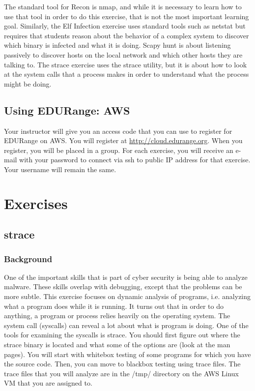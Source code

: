 \documentclass[11pt]{report}
\begin{document}
 The standard tool for Recon is nmap, and while it is necessary to learn how to use 
that tool in order to do this exercise, that is
not the most important learning goal.  Similarly, the Elf Infection 
exercise uses standard tools such as netstat but requires that students
reason about the behavior of a complex system to discover which binary is infected and 
what it is doing.
Scapy hunt is about listening passively to discover hosts on the local network and 
which other hosts they are talking to.
The strace exercise uses the strace utility, but it is about how to look at the system calls that
a process makes in order to understand what the process might be doing.  


\subsection*{Using EDURange: AWS}
Your instructor will give you an access code that you can use to register for 
EDURange on AWS.  You will register at \url{http://cloud.edurange.org}.
When you register, you will be placed in a group.  For each exercise,
you will receive an e-mail with your password to connect via ssh to 
public IP address for that exercise.  Your username will remain the same.



\section{Exercises}

\subsection{strace}
\subsubsection{Background}
One of the important skills that is part of cyber security is being able to analyze malware.  
These skills overlap with debugging, except that the problems can be more subtle.
This exercise focuses on dynamic analysis of programs, i.e. analyzing what a program does while it
is running.  It turns out that in order to do anything, a program or process relies heavily on
the operating system.  The system call (syscalls) can reveal a lot about what is program is doing.
One of the tools for examining the syscalls is strace.  You should first figure out where the strace
binary is located and what some of the options are (look at the man pages).  You will start with 
whitebox testing of some programs 
for which you have the source code.  Then, you can move to blackbox testing using trace files.
The trace files that you will analyze are in the /tmp/ directory on the AWS Linux VM that you are
assigned to.  
\end{document}
